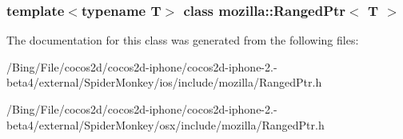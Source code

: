 \subsubsection*{template$<$typename T$>$ class mozilla\-::\-Ranged\-Ptr$<$ T $>$}



The documentation for this class was generated from the following files\-:\begin{DoxyCompactItemize}
\item 
/\-Bing/\-File/cocos2d/cocos2d-\/iphone/cocos2d-\/iphone-\/2.-\/beta4/external/\-Spider\-Monkey/ios/include/mozilla/Ranged\-Ptr.\-h\item 
/\-Bing/\-File/cocos2d/cocos2d-\/iphone/cocos2d-\/iphone-\/2.-\/beta4/external/\-Spider\-Monkey/osx/include/mozilla/Ranged\-Ptr.\-h\end{DoxyCompactItemize}
